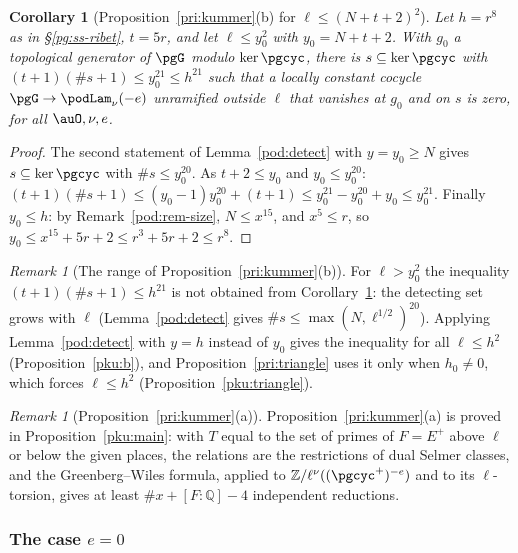 \documentclass[10pt]{amsart}
\newtheorem{corollary}[theorem]{Corollary}
\theoremstyle{definition}
\theoremstyle{remark}
\newtheorem{remark}[theorem]{Remark}
\newcommand{\Z}{\mathbb Z}
\newcommand{\Q}{\mathbb Q}
\begin{document}
\begin{corollary}[Proposition~\ref{pri:kummer}(b) for $\ell\le(N+t+2)^2$]\label{pod:kummer-b}
Let $h=r^8$ as in \S\ref{pg:ss-ribet}, $t=5r$, and let $\ell\le y_0^2$ with $y_0=N+t+2$. With $g_0$ a
topological generator of $\pgG$ modulo $\ker\pgcyc$, there is $s\subseteq\ker\pgcyc$ with
$(t+1)(\#s+1)\le y_0^{21}\le h^{21}$ such that a locally constant cocycle $\pgG\to\podLam_\nu(-e)$
unramified outside $\ell$ that vanishes at $g_0$ and on $s$ is zero, for all $\auO,\nu,e$.
\end{corollary}
\begin{proof}
The second statement of Lemma~\ref{pod:detect} with $y=y_0\ge N$ gives $s\subseteq\ker\pgcyc$ with $\#s\le y_0^{20}$. As $t+2\le y_0$ and
$y_0\le y_0^{20}$: $(t+1)(\#s+1)\le(y_0-1)y_0^{20}+(t+1)\le y_0^{21}-y_0^{20}+y_0\le y_0^{21}$.
Finally $y_0\le h$: by Remark~\ref{pod:rem-size}, $N\le x^{15}$, and $x^5\le r$, so $y_0\le x^{15}+5r+2
\le r^3+5r+2\le r^8$.
\end{proof}

\begin{remark}[The range of Proposition~\ref{pri:kummer}(b)]\label{pod:rem-kummer-b}
For $\ell>y_0^2$ the inequality $(t+1)(\#s+1)\le h^{21}$ is not obtained from
Corollary~\ref{pod:kummer-b}: the detecting set grows with $\ell$ (Lemma~\ref{pod:detect} gives
$\#s\le\max(N,\ell^{1/2})^{20}$). Applying Lemma~\ref{pod:detect} with $y=h$ instead of $y_0$ gives
the inequality for all $\ell\le h^2$ (Proposition~\ref{pku:b}), and Proposition~\ref{pri:triangle}
uses it only when $h_0\ne0$, which forces $\ell\le h^2$ (Proposition~\ref{pku:triangle}).
\end{remark}

\begin{remark}[Proposition~\ref{pri:kummer}(a)]\label{pod:rem-kummer-a}
Proposition~\ref{pri:kummer}(a) is proved in Proposition~\ref{pku:main}: with $T$ equal to the set of
primes of $F=E^+$ above $\ell$ or below the given places, the relations are the restrictions of dual
Selmer classes, and the Greenberg--Wiles formula, applied to $\Z/\ell^\nu((\pgcyc^+)^{-e})$ and to its
$\ell$-torsion, gives at least $\#x+[F:\Q]-4$ independent reductions.
\end{remark}

\subsubsection{The case \texorpdfstring{$e=0$}{e=0}}\label{pod:ss-e0}
\end{document}
